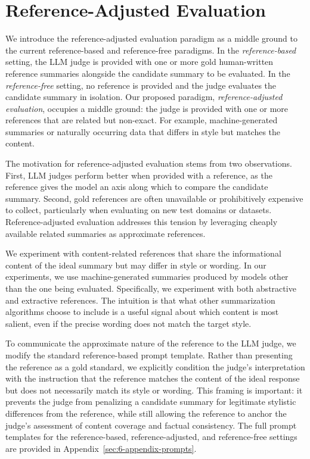 \section{Reference-Adjusted Evaluation}

We introduce the reference-adjusted evaluation paradigm as a middle ground to the current reference-based and reference-free paradigms. In the \textit{reference-based} setting, the LLM judge is provided with one or more gold human-written reference summaries alongside the candidate summary to be evaluated. In the \textit{reference-free} setting, no reference is provided and the judge evaluates the candidate summary in isolation. Our proposed paradigm, \textit{reference-adjusted evaluation}, occupies a middle ground: the judge is provided with one or more references that are related but non-exact. For example, machine-generated summaries or naturally occurring data that differs in style but matches the content.

The motivation for reference-adjusted evaluation stems from two observations. 
First, LLM judges perform better when provided with a reference, as the 
reference gives the model an axis along which to compare the candidate 
summary. Second, gold references are often unavailable or prohibitively 
expensive to collect, particularly when evaluating on new test domains or 
datasets. Reference-adjusted evaluation addresses this tension by leveraging 
cheaply available related summaries as approximate references.

We experiment with content-related references that share the informational content of the ideal summary but may differ in style or wording. In our experiments, we use machine-generated summaries produced by models other than the one being evaluated. Specifically, we experiment with both 
abstractive and extractive references. The intuition is that what other summarization algorithms choose to include is a useful signal about which content is most salient, even if the precise wording does not match the target style.

To communicate the approximate nature of the reference to the LLM judge, 
we modify the standard reference-based prompt template. Rather than presenting 
the reference as a gold standard, we explicitly condition the judge's 
interpretation with the instruction that the reference matches the content 
of the ideal response but does not necessarily match its style or wording. 
This framing is important: it prevents the judge from penalizing a candidate 
summary for legitimate stylistic differences from the reference, while still 
allowing the reference to anchor the judge's assessment of content coverage 
and factual consistency. The full prompt templates for the reference-based, 
reference-adjusted, and reference-free settings are provided in 
Appendix~\ref{sec:6-appendix-prompts}.